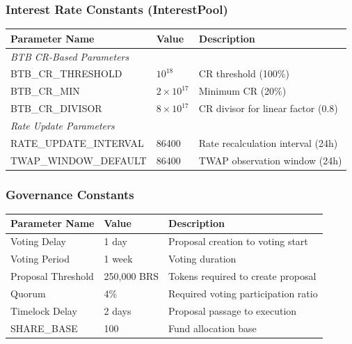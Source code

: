 \documentclass{article}
\begin{document}
\subsubsection{Interest Rate Constants (InterestPool)}

{\small
\begin{center}
\begin{longtable}{p{6cm}p{3.5cm}p{4.5cm}}
\toprule
Parameter Name & Value & Description \\
\midrule
\endhead
\multicolumn{3}{l}{\textit{BTB CR-Based Parameters}} \\
BTB\_CR\_THRESHOLD & $10^{18}$ & CR threshold (100\%) \\
BTB\_CR\_MIN & $2 \times 10^{17}$ & Minimum CR (20\%) \\
BTB\_CR\_DIVISOR & $8 \times 10^{17}$ & CR divisor for linear factor (0.8) \\
\midrule
\multicolumn{3}{l}{\textit{Rate Update Parameters}} \\
RATE\_UPDATE\_INTERVAL & 86400 & Rate recalculation interval (24h) \\
TWAP\_WINDOW\_DEFAULT & 86400 & TWAP observation window (24h) \\
\bottomrule
\end{longtable}
\end{center}
}

\subsubsection{Governance Constants}

\begin{center}
\begin{longtable}{p{5cm}p{4cm}p{5cm}}
\toprule
Parameter Name & Value & Description \\
\midrule
\endhead
Voting Delay & 1 day & Proposal creation to voting start \\
Voting Period & 1 week & Voting duration \\
Proposal Threshold & 250,000 BRS & Tokens required to create proposal \\
Quorum & 4\% & Required voting participation ratio \\
Timelock Delay & 2 days & Proposal passage to execution \\
SHARE\_BASE & 100 & Fund allocation base \\
\bottomrule
\end{longtable}
\end{center}
\end{document}
